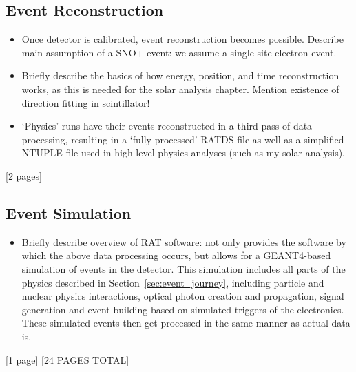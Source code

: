 {    \subsection{Event Reconstruction}
    \begin{itemize}
        \item Once detector is calibrated, event reconstruction becomes possible. Describe main assumption of a SNO+ event: we assume a single-site electron event.
        \item Briefly describe the basics of how energy, position, and time reconstruction works, as this is needed for the solar analysis chapter. Mention existence of direction fitting in scintillator!
        \item `Physics' runs have their events reconstructed in a third pass of data processing, resulting in a `fully-processed' RATDS file as well as a simplified NTUPLE file used in high-level physics analyses (such as my solar analysis).
    \end{itemize}
    [2 pages]
    \subsection{Event Simulation}
    \begin{itemize}
        \item Briefly describe overview of RAT software: not only provides the software by which the above data processing occurs, but allows for a GEANT4-based simulation of events in the detector. This simulation includes all parts of the physics described in Section~\ref{sec:event_journey}, including particle and nuclear physics interactions, optical photon creation and propagation, signal generation and event building based on simulated triggers of the electronics. These simulated events then get processed in the same manner as actual data is.
    \end{itemize}
    [1 page]
    [24 PAGES TOTAL]
}